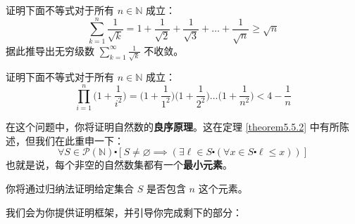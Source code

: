 \begin{exercise}
    证明下面不等式对于所有 $n \in \mathbb{N}$ 成立：
    \[\sum_{k=1}^{n} \frac{1}{\sqrt{k}} = 1+\frac{1}{\sqrt{2}}+\frac{1}{\sqrt{3}}+\dots+\frac{1}{\sqrt{n}} \ge \sqrt{n}\]
    据此推导出无穷级数 $\sum_{k=1}^{\infty} \frac{1}{\sqrt{k}}$ 不收敛。
\end{exercise}

\begin{exercise}
    证明下面不等式对于所有 $n \in \mathbb{N}$ 成立：
    \[\prod_{i=1}^{n} \Big(1+\frac{1}{i^2}\Big) = \Big(1+\frac{1}{1^2}\Big)\Big(1+\frac{1}{2^2}\Big) \dots \Big(1+\frac{1}{n^2}\Big) < 4-\frac{1}{n}\]
\end{exercise}

\begin{exercise}\label{exc:exercises5.7.21}
在这个问题中，你将证明自然数的\textbf{良序原理}。这在定理 \ref{theorem5.5.2} 中有所陈述，但我们在此重申一下：
\[\forall S \in \mathcal{P}(\mathbb{N}) \centerdot [S \ne \varnothing \implies (\exists \ell \in S \centerdot (\forall x \in S \centerdot \ell \le x))]\]
也就是说，每个非空的自然数集都有一个\textbf{最小元素}。

你将通过归纳法证明给定集合 $S$ 是否包含 $n$ 这个元素。

我们会为你提供证明框架，并引导你完成剩下的部分：


\end{exercise}
